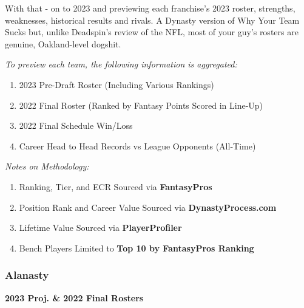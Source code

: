 \documentclass[
]{article}
\begin{document}
With that - on to 2023 and previewing each franchise's 2023 roster,
strengths, weaknesses, historical results and rivals. A Dynasty version
of Why Your Team Sucks but, unlike Deadspin's review of the NFL, most of
your guy's rosters are genuine, Oakland-level dogshit.

\emph{To preview each team, the following information is aggregated:}

\begin{enumerate}
\def\labelenumi{\arabic{enumi}.}
\item
  2023 Pre-Draft Roster (Including Various Rankings)
\item
  2022 Final Roster (Ranked by Fantasy Points Scored in Line-Up)
\item
  2022 Final Schedule Win/Loss
\item
  Career Head to Head Records vs League Opponents (All-Time)
\end{enumerate}

\emph{Notes on Methodology:}

\begin{enumerate}
\def\labelenumi{\arabic{enumi}.}
\item
  Ranking, Tier, and ECR Sourced via \textbf{FantasyPros}
\item
  Position Rank and Career Value Sourced via \textbf{DynastyProcess.com}
\item
  Lifetime Value Sourced via \textbf{PlayerProfiler}
\item
  Bench Players Limited to \textbf{Top 10 by FantasyPros Ranking}
\end{enumerate}

\newpage

\hypertarget{alanasty}{%
\subsubsection{Alanasty}\label{alanasty}}

\textbf{2023 Proj. \& 2022 Final Rosters}
\end{document}
